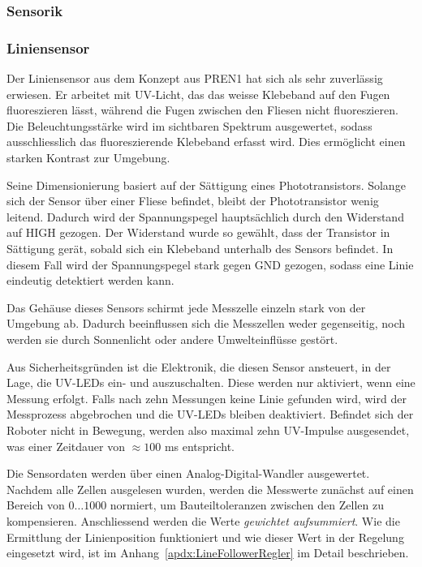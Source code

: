 \documentclass[main.tex]{subfiles} %
\begin{document}

\subsubsection{Sensorik}

\subsubsection*{Liniensensor}

Der Liniensensor aus dem Konzept aus PREN1 hat sich als sehr zuverlässig
erwiesen. Er arbeitet mit UV-Licht, das das weisse Klebeband auf den Fugen
fluoreszieren lässt, während die Fugen zwischen den Fliesen nicht
fluoreszieren. Die Beleuchtungsstärke wird im sichtbaren Spektrum ausgewertet,
sodass ausschliesslich das fluoreszierende Klebeband erfasst wird. Dies
ermöglicht einen starken Kontrast zur Umgebung.


Seine Dimensionierung basiert auf der Sättigung eines Phototransistors. Solange
sich der Sensor über einer Fliese befindet, bleibt der Phototransistor wenig
leitend. Dadurch wird der Spannungspegel hauptsächlich durch den Widerstand auf
HIGH gezogen. Der Widerstand wurde so gewählt, dass der Transistor in Sättigung
gerät, sobald sich ein Klebeband unterhalb des Sensors befindet. In diesem Fall
wird der Spannungspegel stark gegen GND gezogen, sodass eine Linie eindeutig
detektiert werden kann.

Das Gehäuse dieses Sensors schirmt jede Messzelle einzeln stark von der
Umgebung ab. Dadurch beeinflussen sich die Messzellen weder gegenseitig, noch
werden sie durch Sonnenlicht oder andere Umwelteinflüsse gestört.

Aus Sicherheitsgründen ist die Elektronik, die diesen Sensor ansteuert, in der
Lage, die UV-LEDs ein- und auszuschalten. Diese werden nur aktiviert, wenn eine
Messung erfolgt. Falls nach zehn Messungen keine Linie gefunden wird, wird der
Messprozess abgebrochen und die UV-LEDs bleiben deaktiviert. Befindet sich der
Roboter nicht in Bewegung, werden also maximal zehn UV-Impulse ausgesendet, was
einer Zeitdauer von $\approx 100$ ms entspricht.

Die Sensordaten werden über einen Analog-Digital-Wandler ausgewertet. Nachdem
alle Zellen ausgelesen wurden, werden die Messwerte zunächst auf einen Bereich
von $0 \dots 1000$ normiert, um Bauteiltoleranzen zwischen den Zellen zu
kompensieren. Anschliessend werden die Werte \textit{gewichtet aufsummiert}.
Wie die Ermittlung der Linienposition funktioniert und wie dieser Wert in der
Regelung eingesetzt wird, ist im Anhang~\ref{apdx:LineFollowerRegler} im Detail
beschrieben.
\end{document}

